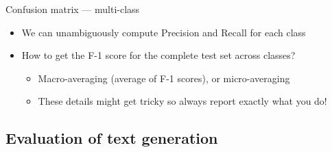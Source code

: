 \documentclass[12pt,aspectratio=169,handout]{beamer}
\begin{document}
\begin{frame}{Confusion matrix --- multi-class}

\begin{itemize}
\item We can unambiguously compute Precision and Recall for each class
\item How to get the F-1 score for the complete test set across classes?
\begin{itemize}
\item Macro-averaging (average of F-1 scores), or micro-averaging
\item These details might get tricky so always report exactly what you do!
\end{itemize}

\end{itemize}

\end{frame}















\subsection{Evaluation of text generation}
\end{document}
